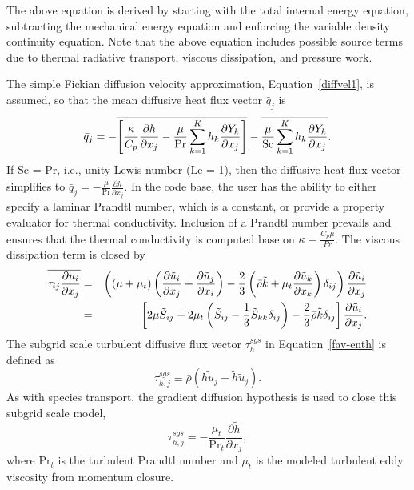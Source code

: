 The above equation is derived by starting with the total internal energy
equation, subtracting the mechanical energy equation and enforcing the
variable density continuity equation. Note that the above equation includes
possible source terms due to thermal radiative transport, viscous dissipation,
and pressure work.

The simple Fickian diffusion velocity approximation, Equation~\ref{diffvel1},
is assumed, so that the mean diffusive heat flux vector $\bar{q}_j$ is
%
\begin{eqnarray}
  \bar{q}_j = - \overline{ \left[ {\kappa \over {C_p}}
                       {{\partial h} \over {\partial x_j}}
                 -  {\mu \over {\rm Pr}} 
        \sum_{k=1}^K h_k {{\partial Y_k} \over {\partial x_j}} \right] }
     - \overline{ {\mu \over {\rm Sc}}
        \sum_{k=1}^K h_k {{\partial Y_k} \over {\partial x_j}} }.
\end{eqnarray}
%
If Sc = Pr, i.e., unity Lewis number (Le = 1), then the diffusive heat
flux vector simplifies to $\bar{q}_j = -\frac{\mu}{\mathrm{Pr}}
\frac{\partial \tilde{h}}{\partial x_j}$.  In the code base, the user
has the ability to either specify a laminar Prandtl number, which is
a constant, or provide a property evaluator for thermal conductivity. Inclusion
of a Prandtl number prevails and ensures that the thermal conductivity is computed
base on $\kappa = \frac{C_p \mu}{Pr}$. The viscous dissipation term is closed by
%
\begin{eqnarray}
\overline{\tau_{ij} {{\partial u_i} \over {\partial x_j }}}
  &=& \left(\left(\mu + \mu_t\right) \left( {{\partial \tilde{u}_i} 
      \over {\partial x_j}}
    + {{\partial \tilde{u}_j} \over {\partial x_i}} \right)
    - {2 \over 3} \left( \bar{\rho} \tilde{k} + 
      \mu_t{{\partial \tilde{u}_k} \over {\partial x_k}} \right)
      \delta_{ij} \right) {{\partial \tilde{u}_i} \over {\partial x_j}}
      \nonumber \\
  &=& \left[ 2 \mu \tilde{S}_{ij} 
    + 2 \mu_t \left( \tilde{S}_{ij} - \frac{1}{3} \tilde{S}_{kk}
      \delta_{ij} \right) - \frac{2}{3} \bar{\rho} \tilde{k}
      \delta_{ij} \right] \frac{\partial \tilde{u}_i}{\partial x_j}.
\end{eqnarray}
%
The subgrid scale turbulent diffusive flux vector $\tau^{sgs}_{h }$ in Equation~\ref{fav-enth}
is defined as
%
\begin{equation}
\tau^{sgs}_{h,j} \equiv \bar{\rho} \left( \widetilde{h u_j} - 
     \tilde{h} \tilde{u}_j \right).
\end{equation}
%
As with species transport, the gradient diffusion hypothesis is used to close
this subgrid scale model,
\begin{equation}
\tau^{sgs}_{h,j} = - \frac{\mu_t}{\mathrm{Pr}_t} \frac{\partial \tilde{h}}{\partial x_j},
\end{equation}
%
where $\mathrm{Pr}_t$ is the turbulent Prandtl number and $\mu_t$ is 
the modeled turbulent eddy viscosity from momentum closure.  

